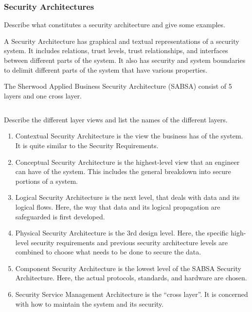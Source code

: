 \section{Security Architectures}\label{sec:Security_Architectures}
\begin{questions}
\question{} Describe what constitutes a security architecture and give some examples.
  \begin{solution}
    A Security Architecture has graphical and textual representations of a security system.
    It includes relations, trust levels, trust relationships, and interfaces between different parts of the system.
    It also has security and system boundaries to delimit different parts of the system that have various properties.
  \end{solution}

\question{} The Sherwood Applied Business Security Architecture (SABSA) consist of 5 layers and one cross layer.
  \begin{parts}
  \part{} Describe the different layer views and list the names of the different layers.
    \begin{solution}
      \begin{enumerate}[noitemsep]
      \item Contextual Security Architecture is the view the business has of the system.
        It is quite similar to the Security Requirements.
      \item Conceptual Security Architecture is the highest-level view that an engineer can have of the system.
        This includes the general breakdown into secure portions of a system.
      \item Logical Security Architecture is the next level, that deals with data and its logical flows.
        Here, the way that data and its logical propagation are safeguarded is first developed.
      \item Physical Security Architecture is the 3rd design level.
        Here, the specific high-level security requirements and previous security architecture levels are combined to choose what needs to be done to secure the data.
      \item Component Security Architecture is the lowest level of the SABSA Security Architecture.
        Here, the actual protocols, standards, and hardware are chosen.
      \item Security Service Management Architecture is the ``cross layer''.
        It is concerned with how to maintain the system and its security.
      \end{enumerate}
    \end{solution}


\end{parts}
\end{questions}
